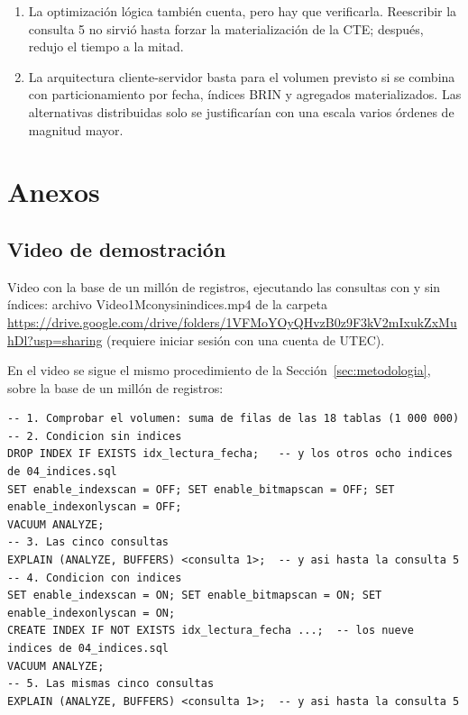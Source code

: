 \documentclass[11pt,letterpaper]{article}
\newcommand{\enlaceVideo}{\url{https://drive.google.com/drive/folders/1VFMoYOyQHvzB0z9F3kV2mIxukZxMuhDl?usp=sharing}}
\newcommand{\tbus}{\textunderscore\allowbreak}
\newcommand{\tb}[1]{{\ttfamily\let\_\tbus #1}}
\begin{document}
\begin{enumerate}[leftmargin=1.6em,itemsep=0.25em]
\item La optimización lógica también cuenta, pero hay que verificarla. Reescribir la consulta 5 no sirvió hasta forzar la materialización de la CTE; después, redujo el tiempo a la mitad.
\item La arquitectura cliente-servidor basta para el volumen previsto si se combina con particionamiento por fecha, índices BRIN y agregados materializados. Las alternativas distribuidas solo se justificarían con una escala varios órdenes de magnitud mayor.
\end{enumerate}

\section{Anexos}

\subsection{Video de demostración}

Video con la base de un millón de registros, ejecutando las consultas con y sin índices: archivo \tb{Video\_1M\_con\_y\_sin\_indices.mp4} de la carpeta \enlaceVideo{} (requiere iniciar sesión con una cuenta de UTEC).

En el video se sigue el mismo procedimiento de la Sección~\ref{sec:metodologia}, sobre la base de un millón de registros:

\begin{lstlisting}
-- 1. Comprobar el volumen: suma de filas de las 18 tablas (1 000 000)
-- 2. Condicion sin indices
DROP INDEX IF EXISTS idx_lectura_fecha;   -- y los otros ocho indices de 04_indices.sql
SET enable_indexscan = OFF; SET enable_bitmapscan = OFF; SET enable_indexonlyscan = OFF;
VACUUM ANALYZE;
-- 3. Las cinco consultas
EXPLAIN (ANALYZE, BUFFERS) <consulta 1>;  -- y asi hasta la consulta 5
-- 4. Condicion con indices
SET enable_indexscan = ON; SET enable_bitmapscan = ON; SET enable_indexonlyscan = ON;
CREATE INDEX IF NOT EXISTS idx_lectura_fecha ...;  -- los nueve indices de 04_indices.sql
VACUUM ANALYZE;
-- 5. Las mismas cinco consultas
EXPLAIN (ANALYZE, BUFFERS) <consulta 1>;  -- y asi hasta la consulta 5
\end{lstlisting}
\end{document}
